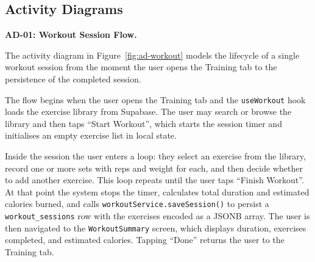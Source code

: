 \subsection{Activity Diagrams}

\textbf{AD-01: Workout Session Flow.}

The activity diagram in Figure~\ref{fig:ad-workout} models the
lifecycle of a single workout session from the moment the user opens
the Training tab to the persistence of the completed session.

The flow begins when the user opens the Training tab and the
\texttt{useWorkout} hook loads the exercise library from Supabase.
The user may search or browse the library and then taps ``Start
Workout'', which starts the session timer and initialises an empty
exercise list in local state.

Inside the session the user enters a loop: they select an exercise
from the library, record one or more sets with reps and weight for
each, and then decide whether to add another exercise. This loop
repeats until the user taps ``Finish Workout''. At that point the
system stops the timer, calculates total duration and estimated
calories burned, and calls \texttt{workoutService.saveSession()} to
persist a \texttt{workout\_sessions} row with the exercises encoded
as a JSONB array. The user is then navigated to the
\texttt{WorkoutSummary} screen, which displays duration, exercises
completed, and estimated calories. Tapping ``Done'' returns the user
to the Training tab.

